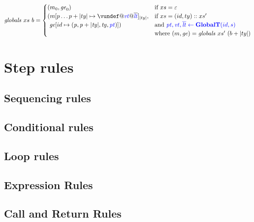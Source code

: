 \documentclass[acmsmall,review,anonymous]{acmart}\settopmatter{printfolios=true,printccs=false,printacmref=false}
\begin{document}

\[\mathit{globals} ~ xs ~ b =
\begin{cases}
  (\mem_0, \genv_0) & \textnormal{if } xs = \varepsilon \\
  (\mem[p \dots p+|ty| \mapsto \vundef@\vt@\overline{\lt}]_{|ty|}, & \textnormal{if } xs = (id,ty)::xs' \\
  ~ \genv[id \mapsto (\mathit{p, p+|ty|,ty,\pt})]) & \textnormal{and } \trule{\globaltres}{\globalt} \\
  & \textnormal{where } (\mem,\genv) = \mathit{globals} ~ xs' ~ (b + |ty|) \\
\end{cases}\]

\section{Step rules}
\label{app:rules}

\subsection{Sequencing rules}

\sequencing

\subsection{Conditional rules}

\conditionals

\subsection{Loop rules}

\loops

\subsection{Expression Rules}

\mallocstep
\valofstep
\assignopstep
\postincstep
\assignstep
\varstep
\unopstep
\binopstep
\callexprstep

\subsection{Call and Return Rules}
\end{document}
